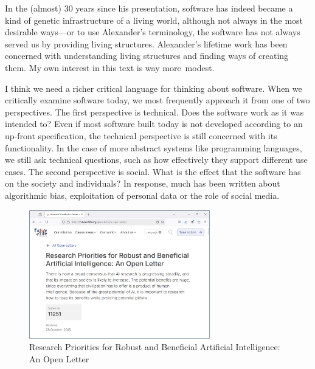 In the (almost) 30 years since his presentation, software has indeed became a kind of genetic
infrastructure of a living world, although not always in the most desirable ways---or to use
Alexander's terminology, the software has not always served us by providing living structures.
Alexander's lifetime work has been concerned with understanding living structures and finding
ways of creating them. My own interest in this text is way more~modest.

I think we need a richer critical language for thinking about software. When we critically
examine software today, we most frequently approach it from one of two perspectives.
The first perspective is technical. Does the software work as it was intended to? Even if
most software built today is not developed according to an up-front specification, the technical
perspective is still concerned with its functionality. In the case of more abstract systems
like programming languages, we still ask technical questions, such as how effectively they support
different use cases. The second perspective is social. What is the effect that the software has on
the society and individuals? In response, much has been written about algorithmic bias, exploitation
of personal data or the role of social media.

\begin{figure}
\centering
\vspace{-1em}
\includegraphics[width=0.7\textwidth]{fig/ai.png}
\caption{Research Priorities for Robust and Beneficial Artificial Intelligence: An Open Letter}
\label{fig:ai}
\end{figure}

